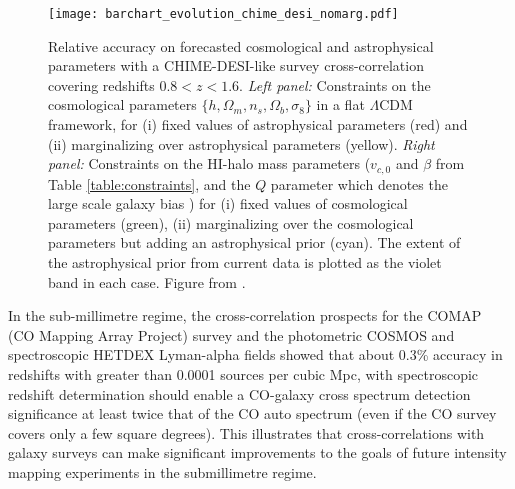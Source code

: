  \begin{figure}
\centering
\texttt{[image: barchart\_evolution\_chime\_desi\_nomarg.pdf]}
\caption{Relative accuracy on forecasted cosmological and astrophysical parameters with a CHIME-DESI-like survey cross-correlation covering redshifts $0.8 < z < 1.6$. \textit{Left panel:} Constraints on the cosmological parameters $\{h, \Omega_m, n_s, \Omega_b, \sigma_8\}$ in a flat $\Lambda$CDM framework, for (i) fixed values of astrophysical parameters (red) and (ii) marginalizing over astrophysical parameters (yellow). \textit{Right panel:} Constraints on the HI-halo mass parameters ($v_{c,0}$ and $\beta$ from Table \ref{table:constraints}, and the $Q$ parameter which denotes the large scale galaxy bias \cite{cole2005}) for (i) fixed values of cosmological parameters (green), (ii) marginalizing over the cosmological parameters but adding an astrophysical prior (cyan). The extent of the astrophysical prior from current data is plotted as the violet band in each case.
 Figure from \cite{hparaa2019}.}
\label{fig:contour2}
\end{figure}


In the sub-millimetre regime, the cross-correlation prospects for the COMAP (CO Mapping Array Project) survey and the photometric COSMOS and spectroscopic HETDEX Lyman-alpha fields \cite{chung2019} showed that about 0.3\% accuracy in redshifts with greater than 0.0001 sources per cubic Mpc, with spectroscopic redshift determination should enable a CO-galaxy cross spectrum detection significance at least twice that of the CO auto spectrum (even if the CO survey covers only a few square degrees). This illustrates that cross-correlations with galaxy surveys can make significant improvements to the goals of future intensity mapping experiments in the submillimetre regime. 


